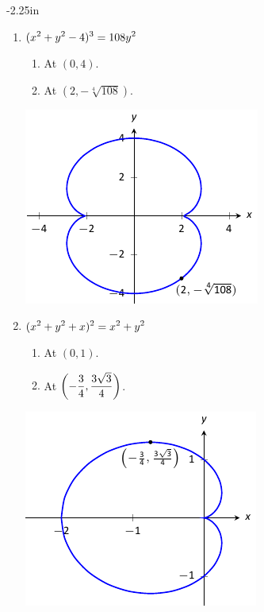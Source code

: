 \begin{adjustwidth*}{}{-2.25in}
\begin{multicols*}{2}
\begin{enumerate}[1),resume]
\item $\displaystyle (x^2+y^2-4)^3 = 108y^2$
\begin{enumerate}
\item	At $(0,4)$.
\item	At $(2,-\sqrt[4]{108})$.
\end{enumerate}
\includegraphics[scale=.8]{figures/fig02_06_ex_25}

\item $\displaystyle (x^2+y^2+x)^2 = x^2+y^2$
\begin{enumerate}
\item	At $(0,1)$.
\item	At $\displaystyle \left(-\frac34, \frac{3 \sqrt{3}}{4}\right)$.
\end{enumerate}
\includegraphics[scale=.8]{figures/fig02_06_ex_26}


\end{enumerate}
\end{multicols*}
\end{adjustwidth*}
